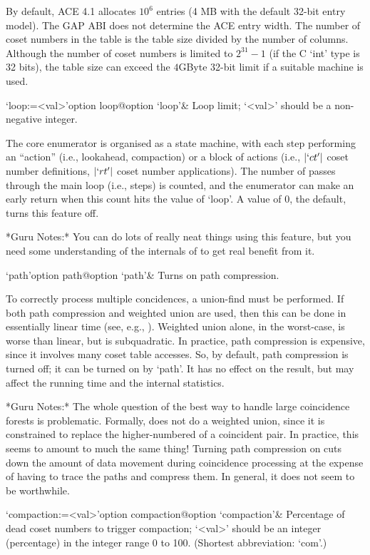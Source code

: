 By default, ACE 4.1 allocates $10^6$ entries (4 MB with the default
32-bit entry model). The GAP ABI does not determine the ACE entry width.  The number of
coset numbers in the table is  the table size divided by the number of
columns.   Although  the  number   of  coset  numbers  is  limited  to
$2^{31}-1$ (if the C `int' type is 32 bits), the table size can exceed
the $4$GByte 32-bit limit if a suitable machine is used.

\>`loop:=<val>'{option loop}@{option `loop'}&
Loop limit; `<val>' should be a non-negative integer.

The core enumerator is organised as a state machine,  with  each  step
performing an ``action'' (i.e., lookahead, compaction) or a  block  of
actions (i.e.,  $|`ct'|$  coset  number  definitions,  $|`rt'|$  coset
number applications). The number  of  passes  through  the  main  loop
(i.e., steps) is counted, and the enumerator can make an early  return
when this count hits the value of `loop'. A value of $0$, the default,
turns this feature off.

*Guru Notes:*
You can do lots of really neat things using this feature, but you need
some understanding of the internals of {\ACE} to get real benefit from
it.

\>`path'{option path}@{option `path'}&
Turns on path compression.

To correctly  process  multiple  concidences,  a  union-find  must  be
performed. If both path compression and weighted union are used,  then
this can be done in essentially linear time (see, e.g., \cite{CLR90}).
Weighted union alone, in the worst-case, is worse than linear, but  is
subquadratic. In practice, path compression  is  expensive,  since  it
involves many coset table accesses. So, by default,  path  compression
is turned off; it can be turned on by `path'. It has no effect on  the
result, but may affect the running time and the internal statistics.

*Guru Notes:*
The whole question of the best way to handle large coincidence forests
is problematic.  Formally, {\ACE} does  not do a weighted union, since
it is constrained to replace the higher-numbered of a coincident pair.
In practice,  this seems  to amount to  much the same  thing!  Turning
path  compression on  cuts down  the  amount of  data movement  during
coincidence processing at the expense of having to trace the paths and
compress them.  In general, it does not seem to be worthwhile.

\>`compaction:=<val>'{option compaction}@{option `compaction'}&
Percentage of dead coset numbers to trigger compaction; 
`<val>' should be an integer (percentage) in the integer  range  0  to
100. (Shortest abbreviation: `com'.)

